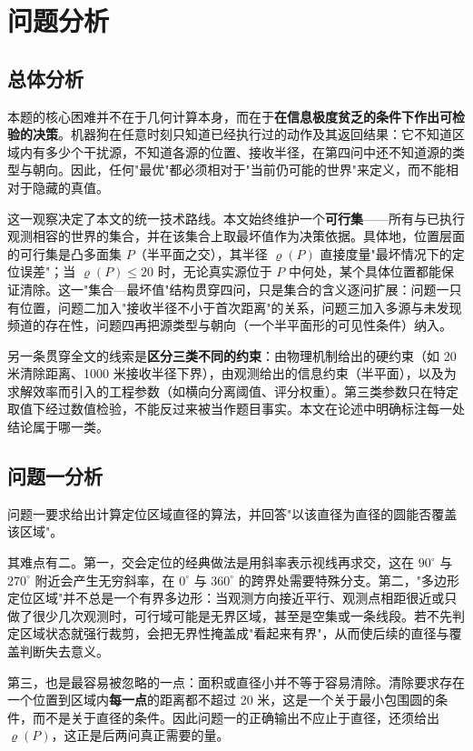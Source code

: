 \section{问题分析}

\subsection{总体分析}

本题的核心困难并不在于几何计算本身，而在于\textbf{在信息极度贫乏的条件下作出可检验的决策}。机器狗在任意时刻只知道已经执行过的动作及其返回结果：它不知道区域内有多少个干扰源，不知道各源的位置、接收半径，在第四问中还不知道源的类型与朝向。因此，任何"最优"都必须相对于"当前仍可能的世界"来定义，而不能相对于隐藏的真值。

这一观察决定了本文的统一技术路线。本文始终维护一个\textbf{可行集}——所有与已执行观测相容的世界的集合，并在该集合上取最坏值作为决策依据。具体地，位置层面的可行集是凸多面集 $P$（半平面之交），其半径 $\varrho(P)$ 直接度量"最坏情况下的定位误差"；当 $\varrho(P)\le20$ 时，无论真实源位于 $P$ 中何处，某个具体位置都能保证清除。这一"集合—最坏值"结构贯穿四问，只是集合的含义逐问扩展：问题一只有位置，问题二加入"接收半径不小于首次距离"的关系，问题三加入多源与未发现频道的存在性，问题四再把源类型与朝向（一个半平面形的可见性条件）纳入。

另一条贯穿全文的线索是\textbf{区分三类不同的约束}：由物理机制给出的硬约束（如 20 米清除距离、1000 米接收半径下界），由观测给出的信息约束（半平面），以及为求解效率而引入的工程参数（如横向分离阈值、评分权重）。第三类参数只在特定取值下经过数值检验，不能反过来被当作题目事实。本文在论述中明确标注每一处结论属于哪一类。

\subsection{问题一分析}

问题一要求给出计算定位区域直径的算法，并回答"以该直径为直径的圆能否覆盖该区域"。

其难点有二。第一，交会定位的经典做法是用斜率表示视线再求交，这在 $90^\circ$ 与 $270^\circ$ 附近会产生无穷斜率，在 $0^\circ$ 与 $360^\circ$ 的跨界处需要特殊分支。第二，"多边形定位区域"并不总是一个有界多边形：当观测方向接近平行、观测点相距很近或只做了很少几次观测时，可行域可能是无界区域，甚至是空集或一条线段。若不先判定区域状态就强行裁剪，会把无界性掩盖成"看起来有界"，从而使后续的直径与覆盖判断失去意义。

第三，也是最容易被忽略的一点：面积或直径小并不等于容易清除。清除要求存在一个位置到区域内\textbf{每一点}的距离都不超过 20 米，这是一个关于最小包围圆的条件，而不是关于直径的条件。因此问题一的正确输出不应止于直径，还须给出 $\varrho(P)$，这正是后两问真正需要的量。

